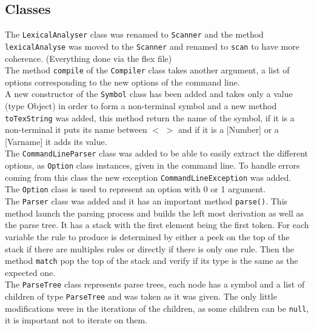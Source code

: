 \documentclass{article}
\begin{document}
\subsection{Classes}
The \texttt{LexicalAnalyser} class was renamed to \texttt{Scanner} and the method \texttt{lexicalAnalyse} was moved to the \texttt{Scanner} and renamed to \texttt{scan} to have more coherence. (Everything done via the flex file) \\

\noindent The method \texttt{compile} of the \texttt{Compiler} class takes another argument, a list of options corresponding to the new options of the command line.\\

\noindent A new constructor of the \texttt{Symbol} class has been added and takes only a value (type Object) in order to form a non-terminal symbol and a new method \texttt{toTexString} was added, this method return the name of the symbol, if it is a non-terminal it puts its name between $<$ $>$ and if it is a [Number] or a [Varname] it adds its value.\\

\noindent The \texttt{CommandLineParser} class was added to be able to easily extract the different options, as \texttt{Option} class instances, given in the command line. To handle errors coming from this class the new exception \texttt{CommandLineException} was added.\\

\noindent The \texttt{Option} class is used to represent an option with 0 or 1 argument.\\

\noindent The \texttt{Parser} class was added and it has an important method \texttt{parse()}. This method launch the parsing process and builds the left most derivation as well as the parse tree.
It has a stack with the first element being the first token. For each variable the rule to produce is determined by either a peek on the top of the stack if there are multiples rules or directly if there is only one rule. Then the method \texttt{match} pop the top of the stack and verify if its type is the same as the expected one.\\

\noindent The \texttt{ParseTree} class represents parse trees, each node has a symbol and a list of children of type \texttt{ParseTree} and was taken as it was given. The only little modifications were in the iterations of the children, as some children can be \texttt{null}, it is important not to iterate on them.
\end{document}
